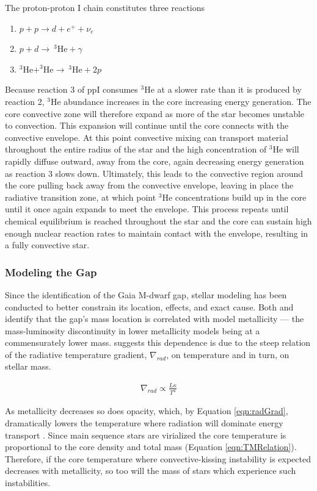 The proton-proton I chain constitutes three reactions 
\begin{enumerate} 
	\item $p + p \longrightarrow d + e^{+} + \nu_{e}$
	\item $p + d \longrightarrow \ ^{3}\text{He} + \gamma$
	\item $^{3}\text{He} + ^{3}\text{He} \longrightarrow \ ^{3}\text{He} + 2p$ 
\end{enumerate} 
Because reaction 3 of ppI consumes $^{3}$He at a slower rate than it is
produced by reaction 2, $^{3}$He abundance increases in the core increasing
energy generation. The core convective zone will therefore expand as more of
the star becomes unstable to convection. This expansion will continue until the
core connects with the convective envelope. At this point convective mixing can
transport material throughout the entire radius of the star and the high
concentration of $^{3}$He will rapidly diffuse outward, away from the core,
again decreasing energy generation as reaction 3 slows down. Ultimately, this
leads to the convective region around the core pulling back away from the
convective envelope, leaving in place the radiative transition zone, at which
point $^{3}$He concentrations build up in the core until it once again expands to
meet the envelope.  This process repeats until chemical equilibrium is reached
throughout the star and the core can sustain high enough nuclear reaction rates
to maintain contact with the envelope, resulting in a fully convective star.


\subsubsection{Modeling the Gap}
Since the identification of the Gaia M-dwarf gap, stellar modeling has been
conducted to better constrain its location, effects, and exact cause.
Both \citet{Mansfield2021} and \citet{Feiden2021} identify that the gap's mass
location is correlated with model metallicity --- the mass-luminosity
discontinuity in lower metallicity models being at a commensurately lower mass.
\citet{Feiden2021} suggests this dependence is due to the steep relation of
the radiative temperature gradient, $\nabla_{rad}$, on temperature and in turn,
on stellar mass.

\begin{align}\label{eqn:radGrad}
	\nabla_{rad} \propto \frac{L\kappa}{T^{4}}
\end{align}

As metallicity decreases so does opacity, which, by Equation \ref{eqn:radGrad},
dramatically lowers the temperature where radiation will dominate energy transport
\citep{Chabrier1997}. Since main sequence stars are virialized the core
temperature is proportional to the core density and total mass (Equation
\ref{eqn:TMRelation}). Therefore, if the core temperature where
convective-kissing instability is expected decreases with metallicity, so too
will the mass of stars which experience such instabilities.

